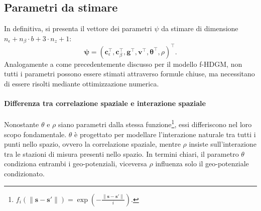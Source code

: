 \subsection[Parametri da stimare]{Parametri da stimare}
In definitiva, si presenta il vettore dei parametri $\psi$ da stimare di dimensione $n_\epsilon + n_\beta\cdot b + 3\cdot n_z+1$:
\begin{equation}
	\boldsymbol{\psi} = (\mathbf{c}_\epsilon^\top, \mathbf{c}_\beta^\top, \mathbf{g}^\top, \mathbf{v}^\top, \boldsymbol{\theta}^\top, \rho)^\top.
\end{equation}
Analogamente a come precedentemente discusso per il modello f-HDGM, non tutti i parametri possono essere stimati attraverso formule chiuse, ma necessitano di essere risolti mediante ottimizzazione numerica.

\paragraph[Differenza tra correlazione spaziale e interazione spaziale]{Differenza tra correlazione spaziale e interazione spaziale} Nonostante $\theta$ e $\rho$ siano parametri dalla stessa funzione\footnote{$f_i(\|\mathbf{s} - \mathbf{s}'\|)=\exp(-\frac{\|\mathbf{s} - \mathbf{s}'\|}{i})$.}, essi differiscono nel loro scopo fondamentale. $\theta$ è progettato per modellare l'interazione naturale tra tutti i punti nello spazio, ovvero la correlazione spaziale, mentre $\rho$ insiste sull'interazione tra le stazioni di misura presenti nello spazio. 
In termini chiari, il parametro $\theta$ condiziona entrambi i geo-potenziali, viceversa $\rho$ influenza solo il geo-potenziale condizionato.

